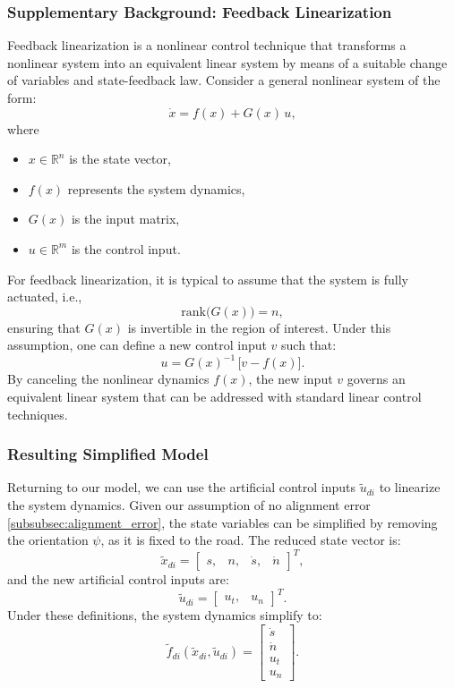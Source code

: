 \subsubsection{Supplementary Background: Feedback Linearization}

Feedback linearization is a nonlinear control technique that transforms a nonlinear system into an equivalent linear system by means of a suitable
change of variables and state-feedback law.
Consider a general nonlinear system of the form:
\begin{equation}
	\dot{x} = f(x) + G(x)\,u,
\end{equation}
where
\begin{itemize}
	\item \(x \in \mathbb{R}^n\) is the state vector,
	\item \(f(x)\) represents the system dynamics,
	\item \(G(x)\) is the input matrix,
	\item \(u \in \mathbb{R}^m\) is the control input.
\end{itemize}
For feedback linearization, it is typical to assume that the system is fully actuated, i.e., \[ \text{rank}\bigl(G(x)\bigr) = n, \] ensuring that
\(G(x)\) is invertible in the region of interest.
Under this assumption, one can define a new control input \(v\) such that:
\begin{equation}
	u = G(x)^{-1}\,\bigl[v - f(x)\bigr].
\end{equation}
By canceling the nonlinear dynamics \(f(x)\), the new input \(v\) governs an equivalent linear system that can be addressed with standard linear
control techniques.

\subsubsection{Resulting Simplified Model}\label{subsubsec:resulting_simplified_model}

Returning to our model, we can use the artificial control inputs \(\tilde{u}_{di}\) to linearize the system dynamics.
Given our assumption of no alignment error \ref{subsubsec:alignment_error}, the state variables can be simplified by removing the orientation
\(\psi\), as it is fixed to the road.
The reduced state vector is:
\[
	\tilde{x}_{di} = \begin{bmatrix} s, & n, & \dot{s}, & \dot{n} \end{bmatrix}^T,
\]
and the new artificial control inputs are:
\[
	\tilde{u}_{di} = \begin{bmatrix} u_t, & u_n \end{bmatrix}^T.
\]
Under these definitions, the system dynamics simplify to:
\begin{equation}
	\label{eq:pm_final_dynamics}
	\tilde{f}_{di}(\tilde{x}_{di}, \tilde{u}_{di}) = \begin{bmatrix}
		\dot{s} \\
		\dot{n} \\
		u_t     \\
		u_n
	\end{bmatrix}.
\end{equation}

